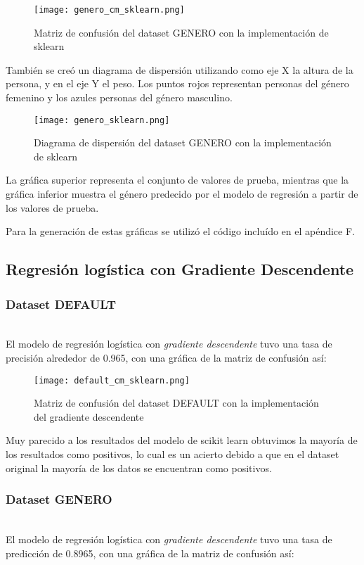 \documentclass[sigconf,authorversion,nonacm]{acmart}
\begin{document}
\begin{figure}[H]
  \centering
  \texttt{[image: genero\_cm\_sklearn.png]}
  \caption{Matriz de confusión del dataset GENERO con la implementación de sklearn}
\end{figure}

También se creó un diagrama de dispersión utilizando como eje X la altura de la persona, y en el eje Y el peso. Los puntos rojos representan personas del género femenino y los azules personas del género masculino.

\begin{figure}[H]
  \centering
  \texttt{[image: genero\_sklearn.png]}
  \caption{Diagrama de dispersión del dataset GENERO con la implementación de sklearn}
\end{figure}

La gráfica superior representa el conjunto de valores de prueba, mientras que la gráfica inferior muestra el género predecido por el modelo de regresión a partir de los valores de prueba.

Para la generación de estas gráficas se utilizó el código incluído en el apéndice F.

\subsection{Regresión logística con Gradiente Descendente}

\subsubsection{Dataset DEFAULT}\hfill\\
El modelo de regresión logística con \textit{gradiente descendente} tuvo una tasa de precisión alrededor de 0.965, con una gráfica de la matriz de confusión así:

\begin{figure}[H]
  \centering
  \texttt{[image: default\_cm\_sklearn.png]}
  \caption{Matriz de confusión del dataset DEFAULT con la implementación del gradiente descendente}
\end{figure}

Muy parecido a los resultados del modelo de scikit learn obtuvimos la mayoría de los resultados como positivos, lo cual es un acierto debido a que en el dataset original la mayoría de los datos se encuentran como positivos.

\subsubsection{Dataset GENERO}\hfill\\
El modelo de regresión logística con \textit{gradiente descendente} tuvo una tasa de predicción de 0.8965, con una gráfica de la matriz de confusión así:
\end{document}
